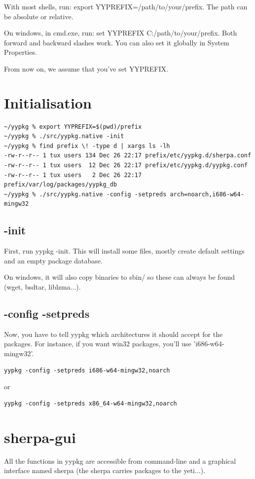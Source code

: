 \documentclass[a4paper]{article}
\begin{document}
With most shells, run: export YYPREFIX=/path/to/your/prefix. The path can be absolute or relative.

On windows, in cmd.exe, run: set YYPREFIX C:/path/to/your/prefix. Both forward and backward slashes work. You can also set it globally in System Properties.

From now on, we assume that you've set YYPREFIX.

\section{Initialisation}
\begin{verbatim}
~/yypkg % export YYPREFIX=$(pwd)/prefix
~/yypkg % ./src/yypkg.native -init
~/yypkg % find prefix \! -type d | xargs ls -lh         
-rw-r--r-- 1 tux users 134 Dec 26 22:17 prefix/etc/yypkg.d/sherpa.conf
-rw-r--r-- 1 tux users  12 Dec 26 22:17 prefix/etc/yypkg.d/yypkg.conf
-rw-r--r-- 1 tux users   2 Dec 26 22:17 prefix/var/log/packages/yypkg_db
~/yypkg % ./src/yypkg.native -config -setpreds arch=noarch,i686-w64-mingw32
\end{verbatim}

\subsection{-init}
First, run yypkg -init. This will install some files, mostly create default settings and an empty package database.

On windows, it will also copy binaries to sbin/ so these can always be found (wget, bsdtar, liblzma...).

\subsection{-config -setpreds}
Now, you have to tell yypkg which architectures it should accept for the packages. For instance, if you want win32 packages, you'll use 'i686-w64-mingw32'.
\begin{verbatim}
yypkg -config -setpreds i686-w64-mingw32,noarch
\end{verbatim}
or
\begin{verbatim}
yypkg -config -setpreds x86_64-w64-mingw32,noarch
\end{verbatim}

\section{sherpa-gui}
All the functions in yypkg are accessible from command-line and a graphical interface named sherpa (the sherpa carries packages to the yeti...).
\end{document}
